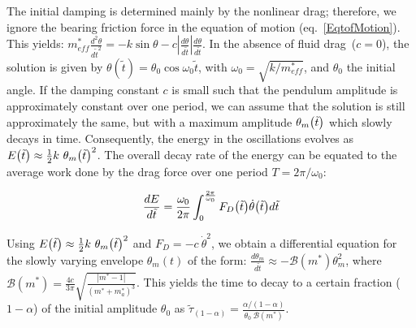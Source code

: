 \documentclass{jfm}
\begin{document}
{\color{black}
	The initial damping is determined mainly by the nonlinear drag; therefore, we ignore the bearing friction force in the equation of motion (eq.~\ref{EqtofMotion}). This yields: $m_{eff}^* \frac{d^2 \theta}{d\tilde{t}^2} = - k \sin{\theta} - c \left| \frac{d \theta}{d \tilde{t}}\right| \frac{d \theta}{d \tilde{t}}$. In the absence of fluid drag~($c = 0$), the solution is given by $\theta (\tilde{t}) = \theta_0 \cos{\omega_0 \tilde{t}}$, with $\omega_0 = \sqrt{k/m_{eff}^*}$, and $\theta_0$ the initial angle. If the damping constant $c$ is small such that the pendulum amplitude is approximately constant over one period, we can assume that the solution is still approximately the same, but with a maximum amplitude $\theta_m \big{(}\tilde{t}\big{)}$ which slowly decays in time. Consequently, the energy in the oscillations evolves as $E\big{(}\tilde{t}\big{)} \approx \frac{1}{2} k \ \theta_m \big{(}\tilde{t}\big{)}^2$.
	The overall decay rate of the energy can be equated to the average work done by the drag force over one period $T = 2\pi /\omega_0$: 
	
	\begin{align}
	\frac{d E}{d \tilde{t}} = \frac{\omega_0}{2 \pi} \int_{0}^{\frac{2 \pi}{\omega_0}} F_D\big{(}\tilde{t}\big{)} \dot{\theta} \big{(}\tilde{t}\big{)} d\tilde{t}
	\label{energydamp}
	\end{align}
	
	Using $E\big{(}\tilde{t}\big{)} \approx \frac{1}{2} k \ \theta_m \big{(}\tilde{t}\big{)}^2$ and $F_D = - c \ \dot \theta^2$, we obtain a differential equation for the slowly varying envelope $\theta_m (t)$ of the form: $\frac{d\theta_m}{d\tilde{t}} \approx - \mathcal{B} (m^*)  \theta_m^2$, where $\mathcal{B} (m^*) = \frac{4 c}{3 \pi} \sqrt{\frac{|m^* -1|}{(m^* +m_a^*)^3}}$.  This yields the time to decay to a certain fraction ($1- \alpha$) of the initial amplitude $\theta_0$ as $\tilde{\tau}_{(1-\alpha)} = \frac{\alpha/(1-\alpha)}{\theta_0 \ \mathcal{B}(m^*) }.$
	
	
	
}
\end{document}
